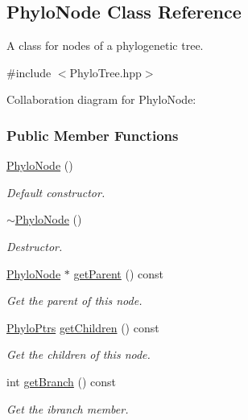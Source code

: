 \hypertarget{classPhyloNode}{\subsection{\-Phylo\-Node \-Class \-Reference}
\label{classPhyloNode}
}


\-A class for nodes of a phylogenetic tree.  




{\ttfamily \#include $<$\-Phylo\-Tree.\-hpp$>$}



\-Collaboration diagram for \-Phylo\-Node\-:
\subsubsection*{\-Public \-Member \-Functions}
\begin{DoxyCompactItemize}
\item 
\hyperlink{classPhyloNode_a82abba4349a6808ba134a89fae92fb7f}{\-Phylo\-Node} ()
\begin{DoxyCompactList}\small\item\em \-Default constructor. \end{DoxyCompactList}\item 
\hyperlink{classPhyloNode_ac1753eafd402a1c709bed60c2a3d04bb}{$\sim$\-Phylo\-Node} ()
\begin{DoxyCompactList}\small\item\em \-Destructor. \end{DoxyCompactList}\item 
\hyperlink{classPhyloNode}{\-Phylo\-Node} $\ast$ \hyperlink{classPhyloNode_a960666762aaed1c4f6ddfbc2aa413892}{get\-Parent} () const 
\begin{DoxyCompactList}\small\item\em \-Get the parent of this node. \end{DoxyCompactList}\item 
\hyperlink{PhyloTree_8hpp_a949af9a126c7f41a99746ced5d664690}{\-Phylo\-Ptrs} \hyperlink{classPhyloNode_ae7877c20c9db63402d07b6f82a346b21}{get\-Children} () const 
\begin{DoxyCompactList}\small\item\em \-Get the children of this node. \end{DoxyCompactList}\item 
int \hyperlink{classPhyloNode_a565c9444607ed8768e9415eacb559123}{get\-Branch} () const 
\begin{DoxyCompactList}\small\item\em \-Get the ibranch member. \end{DoxyCompactList}\item 

\end{DoxyCompactItemize}
